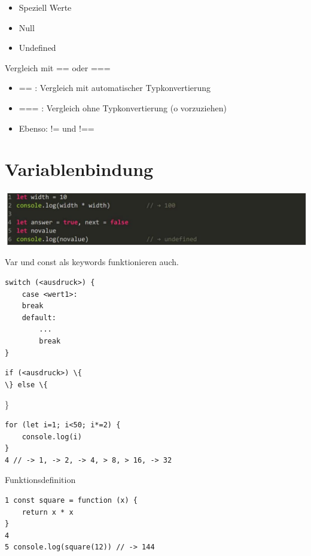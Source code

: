 \documentclass[10pt]{article}
\begin{document}
\begin{itemize}
  \item Speziell Werte
  \item Null
  \item Undefined
\end{itemize}

Vergleich mit == oder ===

\begin{itemize}
  \item == : Vergleich mit automatischer Typkonvertierung
  \item === : Vergleich ohne Typkonvertierung (o vorzuziehen)
  \item Ebenso: != und !==
\end{itemize}

\section*{Variablenbindung}
\begin{center}
\includegraphics[width=\linewidth]{images/2024_12_29_858f09cde51177c71657g-05}
\end{center}

Var und const als keywords funktionieren auch.

\begin{verbatim}
switch (<ausdruck>) {
    case <wert1>:
    break
    default:
        ...
        break
}
\end{verbatim}

\begin{verbatim}
if (<ausdruck>) \{
\} else \{
\end{verbatim}

\}

\begin{verbatim}
for (let i=1; i<50; i*=2) {
    console.log(i)
}
4 // -> 1, -> 2, -> 4, > 8, > 16, -> 32
\end{verbatim}

Funktionsdefinition

\begin{verbatim}
1 const square = function (x) {
    return x * x
}
4
5 console.log(square(12)) // -> 144
\end{verbatim}
\end{document}
